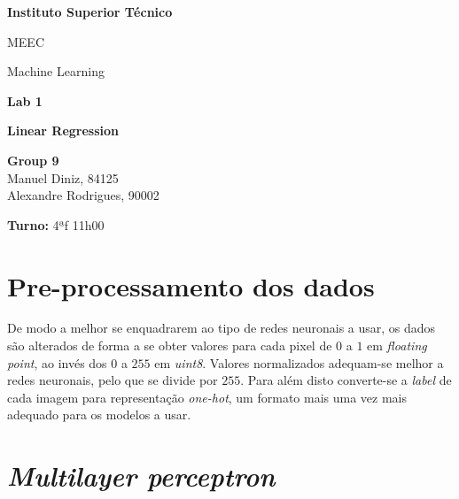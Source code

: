 \documentclass[a4paper,2pt]{report}
\begin{document}
\begin{titlepage}
    \begin{center}
        \vspace*{3cm}
 
        \LARGE
        \textbf{Instituto Superior Técnico}
        \vskip 0.4cm
 
        \Large{MEEC}
        \vskip 0.2cm

        \Large{Machine Learning}
        \vskip 3cm
        

 
        \Huge{\textbf{Lab 1}}
        \vskip 0.5cm

        \huge{\textbf{Linear Regression}}
        \vskip 0.5cm

 
        \vfill
 
        \large
        \textbf{Group 9}\\
        \vspace{0.3cm}
        Manuel Diniz, 84125\\
        Alexandre Rodrigues, 90002\\
        
        \vspace{1cm}

        \textbf{Turno:} 4ªf 11h00

    \end{center}
\end{titlepage}

\tableofcontents
\newpage

\chapter{Pre-processamento dos dados}

    \par De modo a melhor se enquadrarem ao tipo de redes neuronais a usar, os dados são alterados de forma a se obter valores para cada pixel de \(0\) a \(1\) em \textit{floating point}, ao invés dos \(0\) a \(255\) em \textit{uint8}. Valores normalizados adequam-se melhor a redes neuronais, pelo que se divide por \(255\). Para além disto converte-se a \textit{label} de cada imagem para representação \textit{one-hot}, um formato mais uma vez mais adequado para os modelos a usar.

\chapter{\textit{Multilayer perceptron}}
\end{document}
